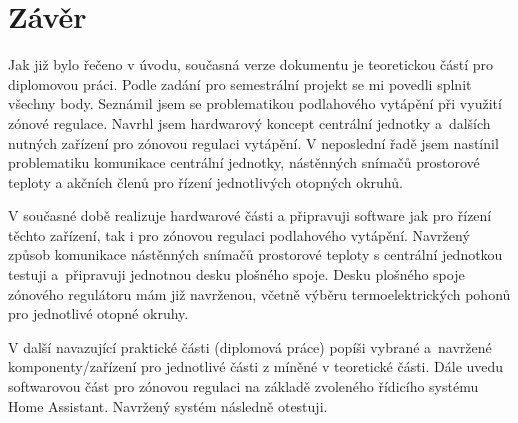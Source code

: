 \chapter{Závěr}
Jak již bylo řečeno v úvodu, současná verze dokumentu je teoretickou částí pro diplomovou práci. Podle zadání pro semestrální projekt se mi povedli splnit všechny body. Seznámil jsem se problematikou podlahového vytápění při využití zónové regulace. Navrhl jsem hardwarový koncept centrální jednotky a~dalších nutných zařízení pro zónovou regulaci vytápění. V  neposlední řadě jsem nastínil problematiku komunikace centrální jednotky, nástěnných snímačů prostorové teploty a akčních členů pro řízení jednotlivých otopných okruhů.

V současné době realizuje hardwarové části a připravuji software jak pro řízení těchto zařízení, tak i pro zónovou regulaci podlahového vytápění. Navržený způsob komunikace nástěnných snímačů prostorové teploty s centrální jednotkou testuji a~připravuji jednotnou desku plošného spoje. Desku plošného spoje zónového regulátoru mám již navrženou, včetně výběru termoelektrických pohonů pro jednotlivé otopné okruhy.

V další navazující praktické části (diplomová práce) popíši vybrané a~navržené komponenty/zařízení pro jednotlivé části z míněné v teoretické části. Dále uvedu softwarovou část pro zónovou regulaci na základě zvoleného řídicího systému Home Assistant. Navržený systém následně otestuji.